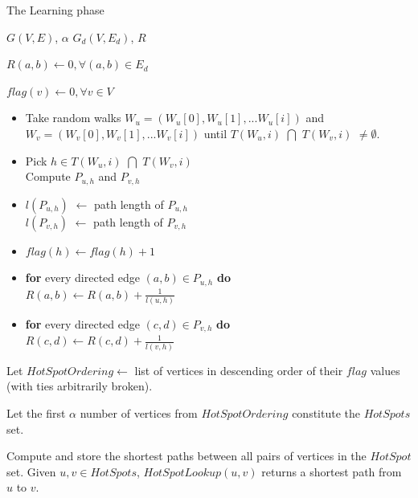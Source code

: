 \documentclass[10pt, conference, compsocconf]{IEEEtran}
\begin{document}
\begin{algorithm}
\label{4_learning_algorithm}
\caption{The Learning phase}
\begin{algorithmic}[1]
\renewcommand{\algorithmicrequire}{\textbf{Input:}}
\renewcommand{\algorithmicensure}{\textbf{Output:}}

\REQUIRE $G(V,E)$, $\alpha$
\ENSURE  $G_d(V,E_d)$, $R$

\STATE $R(a,b)\longleftarrow 0, \forall (a,b)\in E_d$

\STATE $flag(v)\longleftarrow 0, \forall v\in V$

\STATE 
\begin{itemize}
\renewcommand{\labelitemi}{$\bullet $}
\item Take random walks $W_u=(W_u[0],W_u[1],...W_u[i])$ and $W_v=(W_v[0],W_v[1],...W_v[i])$ until $T(W_u,i)$ $\bigcap$ $T(W_v,i)$ $\neq \emptyset$. \item Pick $h \in T(W_u,i)$ $\bigcap$ $T(W_v,i)$ \\
Compute $P_{u,h}$ and $P_{v,h}$\\
\item 
$l(P_{u,h})$ $\longleftarrow$ path length of $P_{u,h}$\\
$l(P_{v,h})$ $\longleftarrow$ path length of $P_{v,h}$


\item $flag(h) \longleftarrow flag(h)+1$

\item \textbf{for} every directed edge $(a,b) \in P_{u,h} $ \textbf{do}\\
\hspace{0.3 in} $R(a,b) \longleftarrow R(a,b) + \frac{1}{l(u,h)}$

\item \textbf{for} every directed edge $(c,d) \in P_{v,h} $ \textbf{do}\\
\hspace{0.3 in} $R(c,d) \longleftarrow R(c,d) + \frac{1}{l(v,h)}$

\end{itemize} 
\ENDFOR

\STATE Let $HotSpotOrdering \longleftarrow$ list of vertices in descending order of their $flag$ values (with ties arbitrarily broken).

\STATE Let the first $\alpha$ number of vertices from $HotSpotOrdering$ constitute the $HotSpots$ set. 

\STATE Compute and store the shortest paths between all pairs of vertices in the $HotSpot$ set. Given $u,v\in HotSpots$, $HotSpotLookup(u,v)$ returns a shortest path from $u$ to $v$.
\end{algorithmic}

\end{algorithm}
\end{document}
